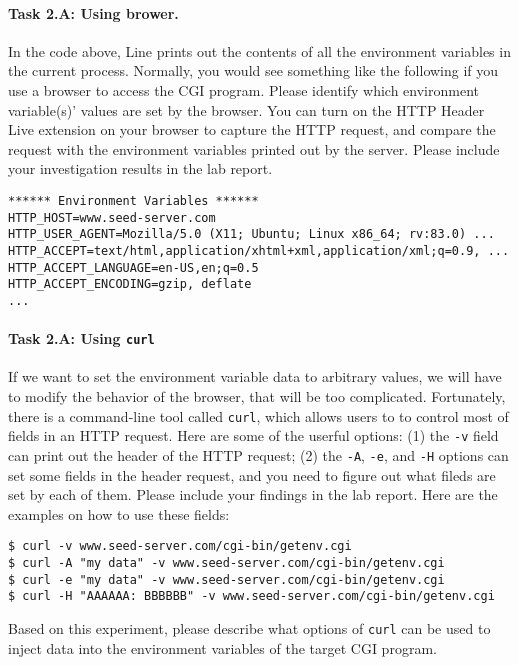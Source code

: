\paragraph{Task 2.A: Using brower.}
In the code above, Line  prints out the contents of all the
environment variables in the current process. Normally, you would see something 
like the following if you use a browser to access the CGI program. Please 
identify which environment variable(s)' values are set by the browser.
You can turn on the HTTP Header Live extension on your browser to 
capture the HTTP request, and compare the request with the 
environment variables printed out by the server. Please include your 
investigation results in the lab report.

\begin{lstlisting}
****** Environment Variables ******
HTTP_HOST=www.seed-server.com
HTTP_USER_AGENT=Mozilla/5.0 (X11; Ubuntu; Linux x86_64; rv:83.0) ...
HTTP_ACCEPT=text/html,application/xhtml+xml,application/xml;q=0.9, ...
HTTP_ACCEPT_LANGUAGE=en-US,en;q=0.5
HTTP_ACCEPT_ENCODING=gzip, deflate
...
\end{lstlisting}

 
\paragraph{Task 2.A: Using \texttt{curl}}
If we want to set the environment variable data to arbitrary values,
we will have to modify the behavior of the browser, that will be too complicated. 
Fortunately, there is a command-line tool called \texttt{curl}, which allows 
users to to control most of fields in an HTTP request. Here are some 
of the userful options: (1) the \texttt{-v} field can print out the header 
of the HTTP request; (2) the \texttt{-A}, \texttt{-e}, and 
\texttt{-H} options can set some fields in the header request, and
you need to figure out what fileds are set by each of them. 
Please include your findings in the lab report. 
Here are the examples on how to use these fields:
 

\begin{lstlisting}
$ curl -v www.seed-server.com/cgi-bin/getenv.cgi
$ curl -A "my data" -v www.seed-server.com/cgi-bin/getenv.cgi
$ curl -e "my data" -v www.seed-server.com/cgi-bin/getenv.cgi
$ curl -H "AAAAAA: BBBBBB" -v www.seed-server.com/cgi-bin/getenv.cgi
\end{lstlisting}
 
Based on this experiment, please describe what options of \texttt{curl} 
can be used to inject data into the environment variables of 
the target CGI program. 


